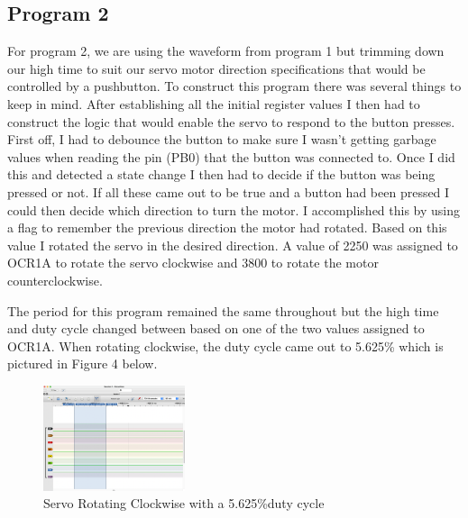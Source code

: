 \documentclass[11pt,pdftex,portrait,letterpaper]{article}
\begin{document}
	
	
	\subsection{Program 2}

	For program 2, we are using the waveform from program 1 but trimming down our high time to suit our servo motor direction specifications that would be controlled by a pushbutton. To construct this program there was several things to keep in mind. After establishing all the initial register values I then had to construct the logic that would enable the servo to respond to the button presses. First off, I had to debounce the button to make sure I wasn't getting garbage values when reading the pin (PB0) that the button was connected to. Once I did this and detected a state change I then had to decide if the button was being pressed or not. If all these came out to be true and a button had been pressed I could then decide which direction to turn the motor. I accomplished this by using a flag to remember the previous direction the motor had rotated. Based on this value I rotated the servo in the desired direction. A value of 2250 was assigned to OCR1A to rotate the servo clockwise and 3800 to rotate the motor counterclockwise.
	
	The period for this program remained the same throughout but the high time and duty cycle changed between based on one of the two values assigned to OCR1A. When rotating clockwise, the duty cycle came out to 5.625\% which is pictured in Figure 4 below.
		\begin{figure}[h]
		\centering
		\includegraphics[width=0.37\textwidth]{./program2_clockwise}	%
		\caption{Servo Rotating Clockwise with a 5.625\%duty cycle}
		\label{f:fig1}	%
	\end{figure}
	
\end{document}
